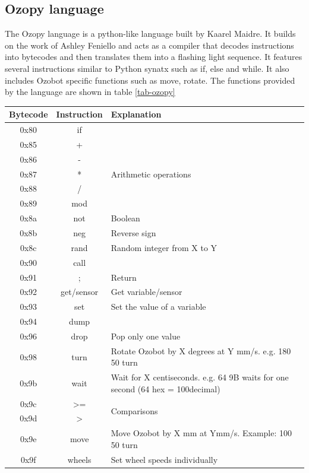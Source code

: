 \documentclass[oneside,%
                    author={Malak Hajji},
                    degree={BSc},
                    title={Designing An Accessible Computational Toolkit For Students},
                  subtitle={With Mixed Visual Abilities}]{dissertation}
\begin{document}
\subsection{Ozopy language}
The Ozopy language is a python-like language built by Kaarel Maidre. It builds on the work of Ashley Feniello and acts as a compiler that decodes instructions into bytecodes and then translates them into a flashing light sequence. It features several instructions similar to Python synatx such as if, else and while. It also includes Ozobot specific functions such as move, rotate. The functions provided by the language are shown in table \ref{tab-ozopy}

\begin{table}
\centering
\begin{tabular}{|c|c|l|}
\hline
\textbf{Bytecode}  &\textbf{Instruction}  & \textbf{Explanation}  \\ \hline
0x80 &if & \\ \hline 
0x85 &+  &\multirow{5}{*}{Arithmetic operations}\\ 
0x86 &- & \\ 
0x87 &*  &    \\ 
0x88 &/   &   \\
0x89 &mod  &  \\ \hline 
0x8a &not   &Boolean \\ \hline 
0x8b &neg &Reverse sign\\ \hline 
0x8c &rand &Random integer from X to Y \\ \hline 
0x90 &call &\\ \hline 
0x91 &; &Return\\ \hline 
0x92 &get/sensor &Get variable/sensor\\ \hline 
0x93 &set &Set the value of a variable\\ \hline 
0x94 &dump &\\ \hline 
0x96 &drop &Pop only one value\\ \hline 
0x98 &turn &Rotate Ozobot by X degrees at Y mm/s. e.g. 180 50 turn\\ \hline 
0x9b &wait &Wait for X centiseconds. e.g. 64 9B waits for one second (64 hex = 100decimal)\\ \hline 
0x9c &\textgreater = &\multirow{2}{*}{Comparisons}\\ 
0x9d &\textgreater &\\ \hline 
0x9e &move &Move Ozobot by X mm at Ymm/s. Example: 100 50 turn\\ \hline  
0x9f &wheels &Set wheel speeds individually\\ \hline 

\end{tabular}
\end{table}
\end{document}
